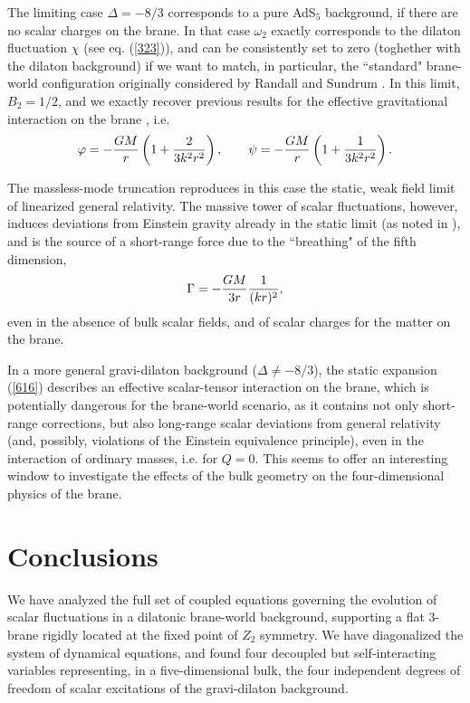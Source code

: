 \documentclass[a4paper,12pt]{article}
\begin{document}
The limiting case $\Delta=-8/3$ corresponds to a pure AdS$_5$
background, if there are no scalar charges on the brane. In that
case $\omega_2$ exactly corresponds to the dilaton fluctuation
$\chi$ (see eq. (\ref{323})), and can be consistently set to zero
(toghether with the dilaton background) if we want to match, in
particular, the ``standard" brane-world configuration originally
considered by Randall and Sundrum \cite{RS2}. In this limit,
$B_{2}=1/2$, and we exactly recover previous results for the
effective gravitational interaction on the brane \cite{27a}, i.e.
\begin{equation} \varphi= -{GM\over r} \left(1+ {2\over 3
k^2r^2}\right), ~~~~~~ \psi= -{GM\over r} \left(1+ {1\over 3
k^2r^2}\right). \label{617}
\end{equation}

The massless-mode  truncation reproduces in this case the static,
weak field limit of linearized  general relativity. The massive
tower of scalar fluctuations, however, induces deviations from
Einstein gravity already in the static limit (as noted in
\cite{27a}), and is the source of a short-range force due to the
``breathing" of the fifth dimension,
\begin{equation} \Gamma= - {GM\over 3 r}{1\over (kr)^2}, \label{618} \end{equation} even
in the absence of bulk scalar fields, and of scalar charges  for
the matter  on the brane.

In a more general gravi-dilaton background ($\Delta \not= -8/3$),
the static expansion (\ref{616}) describes an effective
scalar-tensor interaction on the brane, which is potentially
dangerous for the brane-world scenario, as it contains not only
short-range corrections, but also long-range scalar deviations
from general relativity (and, possibly, violations of the Einstein
equivalence principle), even in the interaction of ordinary
masses, i.e. for $Q=0$. This seems to offer an interesting window
to investigate the effects of the bulk geometry on the
four-dimensional  physics of the brane.



\section{Conclusions}

We have analyzed the full set of coupled equations governing the
evolution of scalar fluctuations in a dilatonic brane-world
background, supporting a flat 3-brane rigidly located at the fixed
point of $Z_2$ symmetry. We have diagonalized the system of
dynamical equations, and found four decoupled but self-interacting
variables representing, in a five-dimensional bulk, the four
independent degrees of freedom of scalar excitations of the
gravi-dilaton background.
\end{document}
